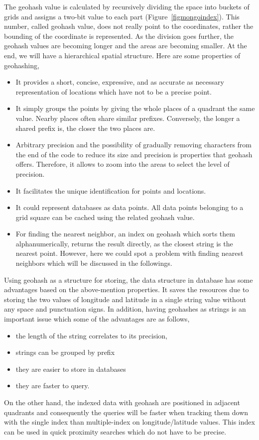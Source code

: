 \documentclass[a4paper,12pt]{article}
\begin{document}
The geohash value is calculated by recursively dividing the space into buckets of grids and assigns a two-bit value to each part (Figure~\ref{figmongoindex}). This number, called geohash value, does not really point to the coordinates, rather the bounding of the coordinate is represented. 
As the division goes further, the geohash values are becoming longer and the areas are becoming smaller. 
At the end, we will have a hierarchical spatial structure. Here are some properties of geohashing,
\begin{itemize}
\item It provides a short, concise, expressive, and as accurate as necessary representation of locations which have not to be a precise point.
\item It simply groups the points by giving the whole places of a quadrant the same value. Nearby places often share similar prefixes. Conversely, the longer a shared prefix is, the closer the two places are. 
\item Arbitrary precision and the possibility of gradually removing characters from the end of the code to reduce its size and precision is properties that geohash offers. Therefore, it allows to zoom into the areas to select the level of precision.
\item It facilitates the unique identification for points and locations.
\item It could represent databases as data points. All data points belonging to a grid square can be cached using the related geohash value.
\item For finding the nearest neighbor, an index on geohash which sorts them alphanumerically, returns the result directly, as the closest string is the nearest point. However, here we could spot a problem with finding nearest neighbors which will be discussed in the followings.
\end{itemize}

Using geohash as a structure for storing, the data structure in database has some advantages based on the above-mention properties. It saves the resources due to storing the two values of longitude and latitude in a single string value without any space and punctuation signs. 
In addition, having geohashes as strings is an important issue which some of the advantages are as follows, 
\begin{itemize}
\item the length of the string correlates to its precision,
\item strings can be grouped by prefix
\item  they are easier to store in databases
\item  they are faster to query. 
\end{itemize}
On the other hand, the indexed data with geohash are positioned in adjacent quadrants and consequently the queries will be faster when tracking them down with the single index than multiple-index on longitude/latitude values. This index can be used in quick proximity searches which do not have to be precise.
\end{document}
